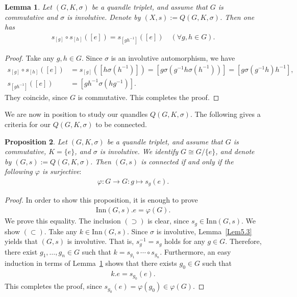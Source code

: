 \documentclass[12pt]{amsart}
\newtheorem{Prop}{Proposition}[section]
\newtheorem{Lem}[Prop]{Lemma}
\theoremstyle{definition}
\begin{document}
\begin{Lem}\label{Lem5.4}
Let $ (G,K,\sigma) $ be a quandle triplet, and assume that $ G $ is commutative and $ \sigma $ is involutive. Denote by $ (X,s) := Q(G,K,\sigma) $. Then one has
\begin{align*}
s_{[g]} \circ s_{[h]} ([e]) = s_{[gh^{-1}]} ([e]) \quad (\forall g,h \in G).
\end{align*}
\end{Lem}

\begin{proof}
Take any $ g,h \in G $. Since $ \sigma $ is an involutive automorphism, we have
\begin{align*}
s_{[g]} \circ s_{[h]}([e]) &= s_{[g]} ([h \sigma(h^{-1})]) = [g \sigma(g^{-1}h \sigma(h^{-1}))] = [g \sigma(g^{-1}h)h^{-1}],\\
s_{[gh^{-1}]}([e]) &= [gh^{-1} \sigma(hg^{-1})].
\end{align*}
They coincide, since $ G $ is commutative. This completes the proof.
\end{proof}

We are now in position to study our quandles $ Q(G,K,\sigma) $. The following gives a criteria for our $ Q(G,K,\sigma) $ to be connected.

\begin{Prop}\label{Prop5.5}
Let $ (G,K,\sigma) $ be a quandle triplet, and assume that $ G $ is commutative, $ K = \{e\} $, and $ \sigma $ is involutive. We identify $ G \cong G/\{e\} $, and denote by $ (G,s) := Q(G,K,\sigma) $. Then $ (G,s) $ is connected if and only if the following $ \varphi $ is surjective$:$
\begin{align*}
\varphi : G \rightarrow G : g \mapsto s_{g}(e).
\end{align*}
\end{Prop}

\begin{proof}
In order to show this proposition, it is enough to prove
\begin{align*}
{\mathrm{Inn}}(G,s).e = \varphi(G).
\end{align*}
We prove this equality. The inclusion $ (\supset) $ is clear, since $ s_{g} \in {\mathrm{Inn}}(G,s) $. We show $ (\subset) $. Take any $ k \in {\mathrm{Inn}}(G,s) $. Since $ \sigma $ is involutive, Lemma~\ref{Lem5.3} yields that $ (G,s) $ is involutive. That is, $ s^{-1}_{g} = s_{g} $ holds for any $ g \in G $. Therefore, there exist $ g_{1}, \ldots, g_{n} \in G $ such that $ k = s_{g_{1}} \circ \cdots \circ s_{g_{n}} $. Furthermore, an easy induction in terms of Lemma~\ref{Lem5.4} shows that there exists $ g_{0} \in G $ such that
\begin{align*}
k.e = s_{g_{0}}(e).
\end{align*}
This completes the proof, since $ s_{g_{0}}(e) = \varphi(g_{0}) \in \varphi(G) $.
\end{proof}
\end{document}
